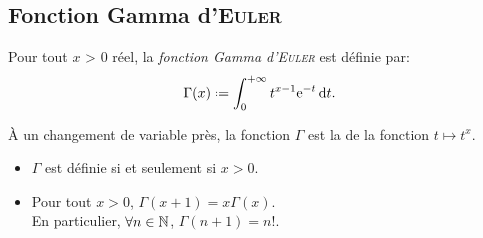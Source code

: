 \subsection{Fonction Gamma d'\textsc{Euler}}

%    

\begin{defi}
    Pour tout $x$ > 0 réel, la \emph{fonction Gamma d'\textsc{Euler}} est définie par: 
    $$\Gamma(x) \defeq \int_{0}^{+\infty} t^{x-1} \me^{-t} \d t.$$
\end{defi}

\begin{remarque}
    À un changement de variable près, la fonction $\Gamma$ est la  de la fonction $t \mapsto t^x$. 
\end{remarque} 

\begin{prop}
    \begin{itemize}
        \item $\Gamma$ est définie si et seulement si $x>0$.
        \item Pour tout $x > 0$, $\Gamma(x+1) = x\Gamma(x)$. \\
        En particulier, $\forall n \in \mathbb{N}$, $\Gamma(n+1) = n!$. 
    \end{itemize}
\end{prop}

